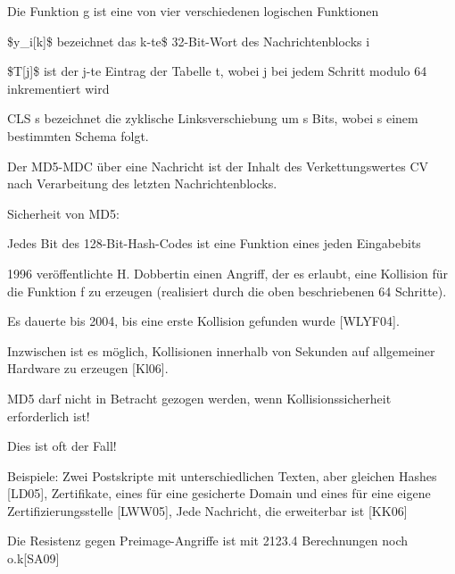 \documentclass[a4paper]{article}
\begin{document}
\begin{multicols}{3}
\begin{itemize*}
            \begin{itemize*}
                  \item Die Funktion g ist eine von vier verschiedenen logischen Funktionen
                  \item \$y\_i{[}k{]}\$ bezeichnet das k-te\$ 32-Bit-Wort des Nachrichtenblocks i
                  \item \$T{[}j{]}\$ ist der j-te Eintrag der Tabelle t, wobei j bei jedem Schritt modulo 64 inkrementiert wird
                  \item CLS s bezeichnet die zyklische Linksverschiebung um s Bits, wobei s einem bestimmten Schema folgt.
            \end{itemize*}
            \item Der MD5-MDC über eine Nachricht ist der Inhalt des Verkettungswertes
            CV nach Verarbeitung des letzten Nachrichtenblocks.
            \item Sicherheit von MD5:
            \begin{itemize*}
                  \item Jedes Bit des 128-Bit-Hash-Codes ist eine Funktion eines jeden Eingabebits
                  \item 1996 veröffentlichte H. Dobbertin einen Angriff, der es erlaubt, eine Kollision für die Funktion f zu erzeugen (realisiert durch die oben beschriebenen 64 Schritte).
                  \item Es dauerte bis 2004, bis eine erste Kollision gefunden wurde {[}WLYF04{]}.
                  \item Inzwischen ist es möglich, Kollisionen innerhalb von Sekunden auf allgemeiner Hardware zu erzeugen {[}Kl06{]}.
                  \item MD5 darf nicht in Betracht gezogen werden, wenn Kollisionssicherheit erforderlich ist!
                  \begin{itemize*} \item Dies ist oft der Fall! \item Beispiele: Zwei Postskripte mit unterschiedlichen Texten, aber gleichen Hashes {[}LD05{]}, Zertifikate, eines für eine gesicherte Domain und eines für eine eigene Zertifizierungsstelle {[}LWW05{]}, Jede Nachricht, die erweiterbar ist {[}KK06{]} \end{itemize*}
                  \item Die Resistenz gegen Preimage-Angriffe ist mit 2123.4 Berechnungen noch o.k{[}SA09{]}
            \end{itemize*}
      \end{itemize*}



\end{multicols}
\end{document}
